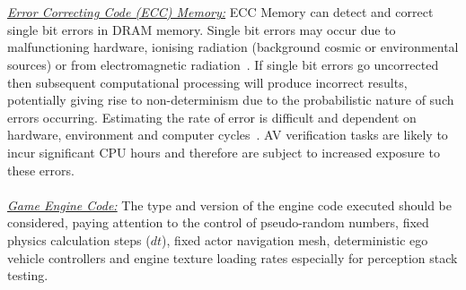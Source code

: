 \documentclass[letterpaper, 10 pt, journal, twoside]{IEEEtran}
\begin{document}
%
%
\\\\
\noindent\underline{\textit{Error Correcting Code (ECC) Memory:}}
ECC Memory can detect and correct single bit errors in DRAM memory. Single bit errors may occur due to malfunctioning hardware, ionising radiation (background cosmic or environmental sources) or from electromagnetic radiation~\cite{dodd2003basic}. If single bit errors go uncorrected then subsequent computational processing will produce incorrect results, potentially giving rise to non-determinism due to the probabilistic nature of such errors occurring. Estimating the rate of error is difficult and dependent on hardware, environment and computer cycles~\cite{mielke2008bit}. AV verification tasks are likely to incur significant CPU hours and therefore are subject to increased exposure to these errors.
\\\\
\noindent\underline{\textit{Game Engine Code:}}
The type and version of the engine code executed should be considered, paying attention to the control of pseudo-random numbers, fixed physics calculation steps ($dt$), fixed actor navigation mesh, deterministic ego vehicle controllers and engine texture loading rates especially for perception stack testing. %
\end{document}

